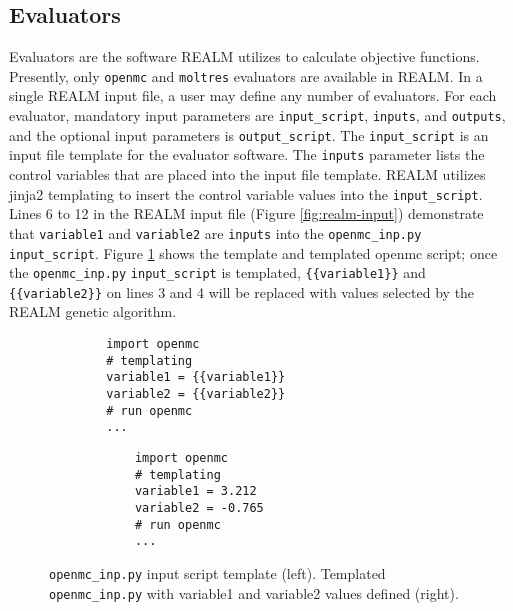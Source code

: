 \subsection{Evaluators}
Evaluators are the software REALM utilizes to calculate objective functions. 
Presently, only \texttt{openmc} and \texttt{moltres} evaluators are available 
in REALM.
In a single REALM input file, a user may define any number of evaluators. 
For each evaluator, mandatory input parameters are \texttt{input\_script}, 
\texttt{inputs}, and \texttt{outputs}, and the optional input parameters is
\texttt{output\_script}. 
The \texttt{input\_script} is an input file template for the evaluator software. 
The \texttt{inputs} parameter lists the control variables that are placed into the 
input file template. 
REALM utilizes jinja2 templating to insert the control variable values into the 
\texttt{input\_script}. 
Lines 6 to 12 in the REALM input file (Figure \ref{fig:realm-input}) demonstrate 
that \texttt{variable1} and \texttt{variable2} are \texttt{inputs} into the 
\texttt{openmc\_inp.py} \texttt{input\_script}. 
Figure \ref{fig:openmcinp.py} shows the template and templated openmc script; 
once the \texttt{openmc\_inp.py} \texttt{input\_script} is templated, 
\texttt{\{\{variable1\}\}} and \texttt{\{\{variable2\}\}}  on lines 3 and 4 will be 
replaced with values selected by the REALM genetic algorithm. 
\begin{figure}[]
    \begin{minipage}{0.4\textwidth}
        \centering
    \begin{verbatim}
        import openmc 
        # templating 
        variable1 = {{variable1}}
        variable2 = {{variable2}}
        # run openmc 
        ... 
    \end{verbatim}
    \end{minipage}
    \hspace{2cm}
    \begin{minipage}{0.4\textwidth}
        \centering
        \begin{verbatim}
            import openmc 
            # templating 
            variable1 = 3.212
            variable2 = -0.765
            # run openmc 
            ... 
        \end{verbatim}
        \end{minipage}
    \caption{\texttt{openmc\_inp.py} input script template (left). 
             Templated \texttt{openmc\_inp.py} with variable1 and variable2 
             values defined (right).}
    \label{fig:openmcinp.py}
\end{figure}

